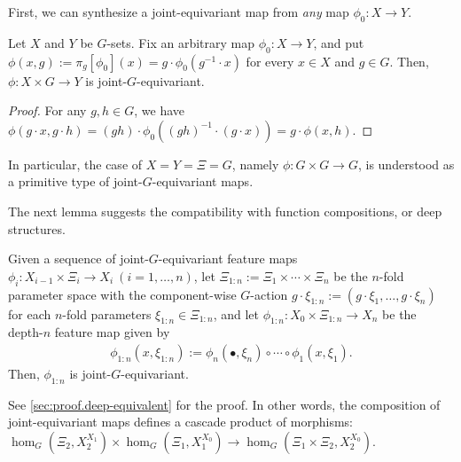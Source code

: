 First, we can synthesize a joint-equivariant map from \emph{any} map $\phi_0:X \to Y$.
\begin{lemma} \label{lem:construct-equivalent}
    Let $X$ and $Y$ be $G$-sets.
    Fix an arbitrary map $\phi_0:X \to Y$, and put $\phi(x,g) := \pi_g[\phi_0](x) = g \cdot \phi_0(g^{-1} \cdot x)$ for every $x \in X$ and $g \in G$. Then, $\phi : X \times G \to Y$ is joint-$G$-equivariant.
\end{lemma}
\begin{proof}
    For any $g,h \in G$, we have $\phi( g \cdot x, g \cdot h )
    = (gh) \cdot \phi_0( (gh)^{-1} \cdot (g \cdot x) ) 
    = g \cdot \phi(x,h)$.
\end{proof}
In particular, the case of $X=Y=\Xi=G$, namely $\phi:G \times G \to G$, is understood as a primitive type of joint-$G$-equivariant maps.

The next lemma suggests the compatibility with function compositions, or deep structures.
\begin{lemma} \label{lem:deep-equivalent}%
Given a sequence of joint-$G$-equivariant feature maps $\phi_i : X_{i-1} \times \Xi_i \to X_i \ (i=1,\ldots,n)$, 
let $\Xi_{1:n} := \Xi_1 \times \cdots \times \Xi_n$ be the $n$-fold parameter space with the component-wise $G$-action $g \cdot \xi_{1:n} := (g \cdot \xi_1, \ldots, g \cdot \xi_n)$ for each $n$-fold parameters $\xi_{1:n} \in \Xi_{1:n}$, and let $\phi_{1:n} : X_0 \times \Xi_{1:n} \to X_n$ be the depth-$n$ feature map given by
\begin{align*}
\phi_{1:n}(x, \xi_{1:n}) := \phi_n(\bullet,\xi_n) \circ \cdots \circ \phi_1(x, \xi_1).    
\end{align*}
Then, $\phi_{1:n}$ is joint-$G$-equivariant.
\end{lemma}
See \cref{sec:proof.deep-equivalent} for the proof. In other words, the composition of joint-equivariant maps defines a cascade product of morphisms: $\hom_G(\Xi_2, X_2^{X_1}) \times \hom_G(\Xi_1, X_1^{X_0}) \to \hom_G(\Xi_1 \times \Xi_2, X_2^{X_0})$.

